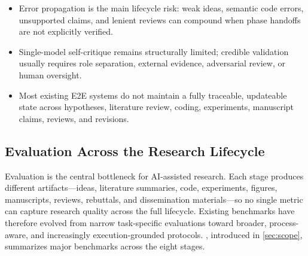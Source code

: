 {}{%

\begin{itemize}[leftmargin=8pt, itemsep=0pt, topsep=0pt, parsep=0pt]

\item Error propagation is the main lifecycle risk: weak ideas, semantic code errors, unsupported claims, and lenient reviews can compound when phase handoffs are not explicitly verified.

\end{itemize}

\anadotrule

\begin{itemize}[leftmargin=8pt, itemsep=0pt, topsep=0pt, parsep=0pt]

\item Single-model self-critique remains structurally limited; credible validation usually requires role separation, external evidence, adversarial review, or human oversight.

\end{itemize}

\anadotrule

\begin{itemize}[leftmargin=8pt, itemsep=0pt, topsep=0pt, parsep=0pt]

\item Most existing E2E systems do not maintain a fully traceable, updateable state across hypotheses, literature review, coding, experiments, manuscript claims, reviews, and revisions.
\end{itemize}
}
\vspace{8pt}




\subsection{Evaluation Across the Research Lifecycle}
\label{sec:lifecycle_eval}

Evaluation is the central bottleneck for AI-assisted research. Each stage produces different artifacts---ideas, literature summaries, code, experiments, figures, manuscripts, reviews, rebuttals, and dissemination materials---so no single metric can capture research quality across the full lifecycle. Existing benchmarks have therefore evolved from narrow task-specific evaluations toward broader, process-aware, and increasingly execution-grounded protocols. 
, introduced in \cref{sec:scope}, summarizes major benchmarks across the eight stages.

